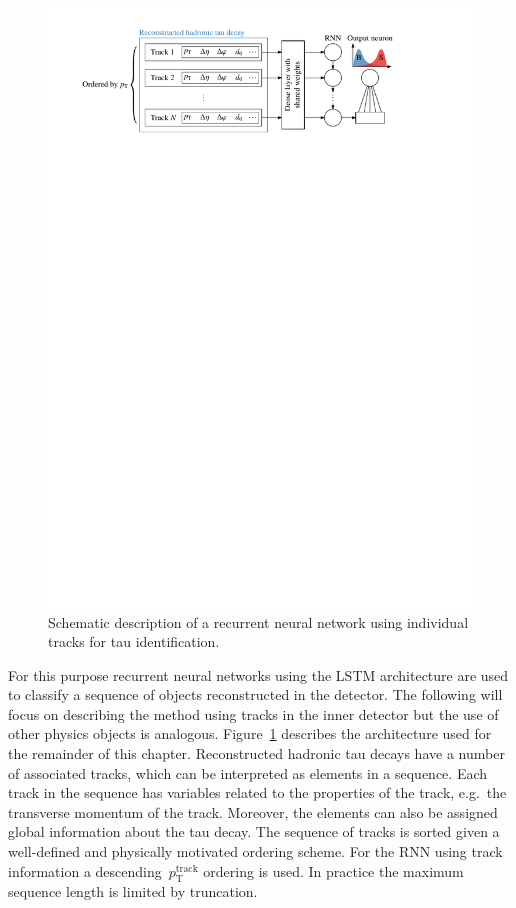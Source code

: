 \begin{figure}[htb]
  \centering
  \includegraphics[scale=0.9]{./figures/rnn/track_rnn_schematic.pdf}
  \caption{Schematic description of a recurrent neural network using individual
    tracks for tau identification.}
  \label{fig:track_rnn_schematic}
\end{figure}

For this purpose recurrent neural networks using the LSTM architecture are used
to classify a sequence of objects reconstructed in the detector. The following
will focus on describing the method using tracks in the inner detector but the
use of other physics objects is analogous. Figure~\ref{fig:track_rnn_schematic}
describes the architecture used for the remainder of this chapter. Reconstructed
hadronic tau decays have a number of associated tracks, which can be interpreted
as elements in a sequence. Each track in the sequence has variables related to
the properties of the track, e.g.\ the transverse momentum of the track.
Moreover, the elements can also be assigned global information about the tau
decay. The sequence of tracks is sorted given a well-defined and physically
motivated ordering scheme. For the RNN using track information a
descending~$p_\text{T}^\text{track}$ ordering is used. In practice the maximum
sequence length is limited by truncation.

